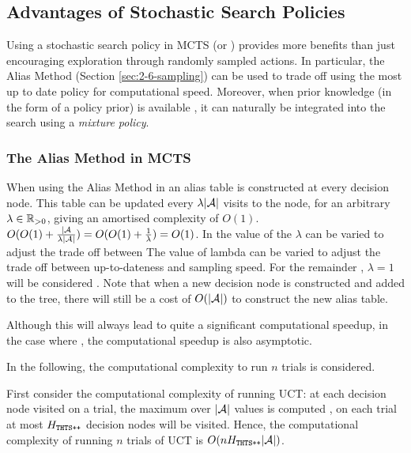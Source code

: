     \subsection{Advantages of Stochastic Search Policies}
    \label{sec:4-2-3-stoch_search_policies}

        Using a stochastic search policy in MCTS (or \thtspp) provides more benefits than just encouraging exploration through randomly sampled actions. In particular, the Alias Method (Section \ref{sec:2-6-sampling}) can be used to trade off using the most up to date policy for computational speed. Moreover, when prior knowledge (in the form of a policy prior) is available , it can naturally be integrated into the search using a \textit{mixture policy}.

         \complexityq






        \subsubsection{The Alias Method in MCTS}

        When using the Alias Method in \thtspp\ewe an alias table  is constructed at every decision node. This table can be updated every $\lambda|\mathcal{A}|$ visits to the node, for an arbitrary $\lambda\in\mathbb{R}_{>0}$, giving an amortised complexity of $O(1)$.  $O(O(1)+\frac{|\mathcal{A}}{\lambda|\mathcal{A}|}) = O(O(1)+\frac{1}{\lambda}) = O(1)$.  In \thtspp the value of the $\lambda$ can be varied to adjust the trade off between The value of lambda can be varied to adjust the trade off between up-to-dateness and sampling speed. For the remainder , $\lambda=1$ will be considered . Note that when a new decision node is constructed and added to the tree, there will still be a cost of $O(|\mathcal{A}|)$ to construct the new alias table.
        
        Although this will always lead to quite a significant computational speedup, in the case where \mctsmode, the computational speedup is also asymptotic. 

        In the following, the computational complexity to run $n$ trials is considered.
        
        First consider the computational complexity of running UCT: at each decision node visited on a trial, the maximum over $|\mathcal{A}|$ values is computed , on each trial at most $H_{{\textnormal{\texttt{THTS++}}}}$ decision nodes will be visited. Hence, the computational complexity of running $n$ trials of UCT is $O(nH_{{\textnormal{\texttt{THTS++}}}}|\mathcal{A}|)$.

